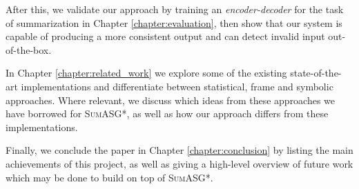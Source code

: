 After this, we validate our approach by training an \textit{encoder-decoder} for the task of summarization in Chapter \ref{chapter:evaluation}, then show that our system is capable of producing a more consistent output and can detect invalid input out-of-the-box.

In Chapter \ref{chapter:related_work} we explore some of the existing state-of-the-art implementations and differentiate between statistical, frame and symbolic approaches. Where relevant, we discuss which ideas from these approaches we have borrowed for \textsc{SumASG*}, as well as how our approach differs from these implementations.

Finally, we conclude the paper in Chapter \ref{chapter:conclusion} by listing the main achievements of this project, as well as giving a high-level overview of future work which may be done to build on top of \textsc{SumASG*}.